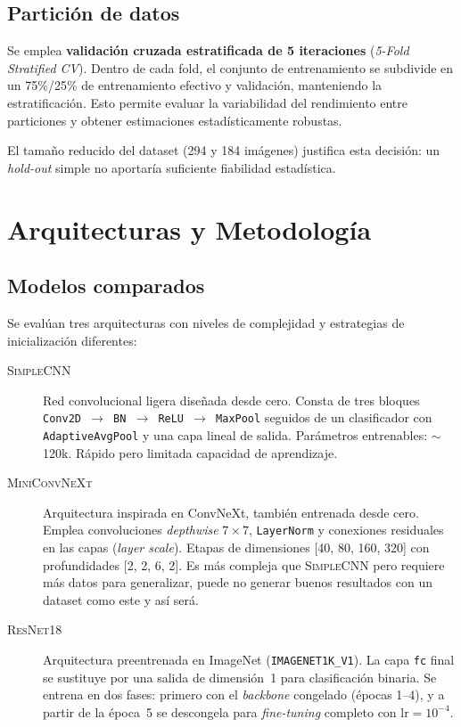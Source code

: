 \documentclass[11pt, a4paper]{article}
\begin{document}
\subsection{Partición de datos}

Se emplea \textbf{validación cruzada estratificada de 5 iteraciones}
(\textit{5-Fold Stratified CV}). Dentro de cada fold, el conjunto de
entrenamiento se subdivide en un 75\%/25\% de entrenamiento efectivo y
validación, manteniendo la estratificación. Esto permite evaluar la variabilidad
del rendimiento entre particiones y obtener estimaciones estadísticamente robustas.

El tamaño reducido del dataset (294 y 184 imágenes) justifica esta decisión:
un \textit{hold-out} simple no aportaría suficiente fiabilidad estadística.

\section{Arquitecturas y Metodología}

\subsection{Modelos comparados}

Se evalúan tres arquitecturas con niveles de complejidad y estrategias de
inicialización diferentes:

\begin{description}
    \item[\textsc{SimpleCNN}] Red convolucional ligera diseñada desde cero. Consta
    de tres bloques \texttt{Conv2D~$\to$~BN~$\to$~ReLU~$\to$~MaxPool} seguidos de
    un clasificador con \texttt{AdaptiveAvgPool} y una capa lineal de salida.
    Parámetros entrenables: $\sim$120k. Rápido pero limitada capacidad de aprendizaje.

    \item[\textsc{MiniConvNeXt}] Arquitectura inspirada en ConvNeXt,
    también entrenada desde cero. Emplea convoluciones \textit{depthwise} $7\times7$,
    \texttt{LayerNorm} y conexiones residuales en las capas (\textit{layer scale}).
    Etapas de dimensiones [40, 80, 160, 320] con profundidades [2, 2, 6, 2].
    Es más compleja que \textsc{SimpleCNN} pero requiere más datos para
    generalizar, puede no generar buenos resultados con un dataset como este y así será.

    \item[\textsc{ResNet18}] Arquitectura preentrenada en ImageNet
    (\texttt{IMAGENET1K\_V1}). La capa \texttt{fc} final se sustituye por una
    salida de dimensión~1 para clasificación binaria. Se entrena en dos fases:
    primero con el \textit{backbone} congelado (épocas 1--4), y a partir de la
    época~5 se descongela para \textit{fine-tuning} completo con
    $\text{lr} = 10^{-4}$.
\end{description}
\end{document}

